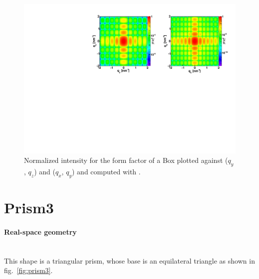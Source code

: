 \begin{figure}[h]
\begin{center}
\includegraphics[width=\textwidth]{Figures/figffbox}
\end{center}
\caption{Normalized intensity for the form factor of a Box plotted against ($q_y$, $q_z$) and  ($q_x$, $q_y$) and computed with .}
\label{fig:FFBoxEx}
\end{figure}

\FloatBarrier
\newpage%
\section{Prism3} 

\paragraph{Real-space geometry}\mbox{}\\
This shape is a triangular prism, whose base is an equilateral
triangle as shown in fig.~\ref{fig:prism3}.

